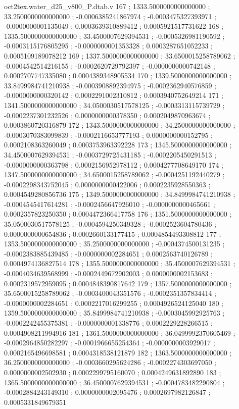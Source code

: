 \begin{filecontents}[overwrite]{oct2tex.water_d25_v800_P.dtab.v}
167 ; 1333.5000000000000000 ; 33.2500000000000000 ; -0.0006385241867974 ; -0.0003475327393971 ; -0.0000000001135049 ; 0.0003639310889412 ; 0.0005921517731622
168 ; 1335.5000000000000000 ; 33.4500007629394531 ; -0.0005326981190592 ; -0.0003115176805295 ; -0.0000000001353328 ; 0.0003287651052233 ; 0.0005109189078212
169 ; 1337.5000000000000000 ; 33.6500015258789062 ; -0.0004542514216155 ; -0.0002620729792397 ; -0.0000000000742148 ; 0.0002707747335080 ; 0.0004389348905534
170 ; 1339.5000000000000000 ; 33.8499984741210938 ; -0.0003908892394975 ; -0.0002362940576859 ; -0.0000000000320142 ; 0.0002291002310812 ; 0.0003940752649214
171 ; 1341.5000000000000000 ; 34.0500030517578125 ; -0.0003313115739729 ; -0.0002237301232526 ; 0.0000000000378350 ; 0.0002049870963674 ; 0.0003860720316879
172 ; 1343.5000000000000000 ; 34.2500000000000000 ; -0.0003070383099839 ; -0.0002116653777193 ; 0.0000000000152795 ; 0.0002108363260049 ; 0.0003753963392228
173 ; 1345.5000000000000000 ; 34.4500007629394531 ; -0.0003729725431185 ; -0.0002205450291513 ; -0.0000000000363798 ; 0.0002156952978112 ; 0.0004277708649170
174 ; 1347.5000000000000000 ; 34.6500015258789062 ; -0.0004251192440279 ; -0.0002298343752045 ; 0.0000000000422006 ; 0.0002235928550363 ; 0.0004549280856736
175 ; 1349.5000000000000000 ; 34.8499984741210938 ; -0.0004545417614281 ; -0.0002456647926010 ; -0.0000000000465661 ; 0.0002357823250350 ; 0.0004472366417758
176 ; 1351.5000000000000000 ; 35.0500030517578125 ; -0.0004594250349328 ; -0.0002523604780436 ; 0.0000000000654836 ; 0.0002660133177415 ; 0.0004854493308812
177 ; 1353.5000000000000000 ; 35.2500000000000000 ; -0.0004374500131235 ; -0.0002383885439485 ; -0.0000000002284651 ; 0.0002563740126789 ; 0.0004974136827514
178 ; 1355.5000000000000000 ; 35.4500007629394531 ; -0.0004034639568999 ; -0.0002449672902003 ; 0.0000000002153683 ; 0.0002319572959095 ; 0.0004848390817642
179 ; 1357.5000000000000000 ; 35.6500015258789062 ; -0.0003400043351576 ; -0.0002351357834414 ; -0.0000000002284651 ; 0.0002217016299255 ; 0.0004926524125040
180 ; 1359.5000000000000000 ; 35.8499984741210938 ; -0.0003045992925763 ; -0.0002242455375381 ; -0.0000000001338776 ; 0.0002229228266515 ; 0.0004908211994916
181 ; 1361.5000000000000000 ; 36.0499992370605469 ; -0.0002964850282297 ; -0.0001966655254364 ; -0.0000000003929017 ; 0.0002165496698581 ; 0.0004318538121879
182 ; 1363.5000000000000000 ; 36.2500000000000000 ; -0.0003660295624286 ; -0.0002274303697050 ; 0.0000000002502930 ; 0.0002299795160070 ; 0.0004249631892890
183 ; 1365.5000000000000000 ; 36.4500007629394531 ; -0.0004783482290804 ; -0.0002884243149310 ; 0.0000000002095476 ; 0.0002697982126847 ; 0.0005331849679351

\end{filecontents}
